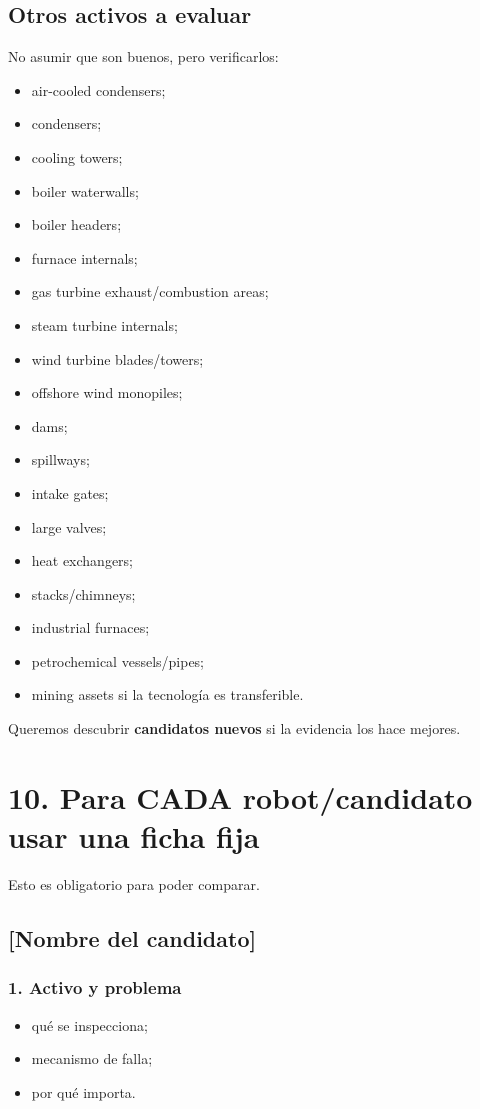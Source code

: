 \documentclass[11pt,a4paper]{article}
\begin{document}
\subsection*{Otros activos a evaluar}
No asumir que son buenos, pero verificarlos:

\begin{itemize}
\item air-cooled condensers;
\item condensers;
\item cooling towers;
\item boiler waterwalls;
\item boiler headers;
\item furnace internals;
\item gas turbine exhaust/combustion areas;
\item steam turbine internals;
\item wind turbine blades/towers;
\item offshore wind monopiles;
\item dams;
\item spillways;
\item intake gates;
\item large valves;
\item heat exchangers;
\item stacks/chimneys;
\item industrial furnaces;
\item petrochemical vessels/pipes;
\item mining assets si la tecnología es transferible.
\end{itemize}

Queremos descubrir \textbf{candidatos nuevos} si la evidencia los hace mejores.


\section*{10. Para CADA robot/candidato usar una ficha fija}
Esto es obligatorio para poder comparar.


\subsection*{[Nombre del candidato]}

\subsubsection*{1. Activo y problema}
\begin{itemize}
\item qué se inspecciona;
\item mecanismo de falla;
\item por qué importa.
\end{itemize}
\end{document}
